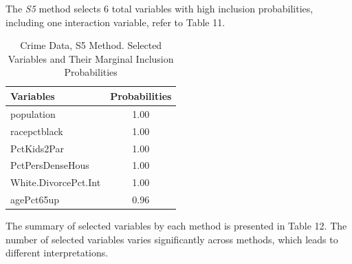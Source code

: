 \documentclass[
  11pt,
]{article}
\begin{document}
The \emph{S5} method selects 6 total variables with high inclusion
probabilities, including one interaction variable, refer to Table 11.

\begin{table}[H]

\caption{\label{tab:S5 Results}Crime Data, S5 Method. Selected Variables and Their Marginal Inclusion Probabilities}
\centering
\fontsize{10}{12}\selectfont
\begin{tabular}[t]{lc}
\toprule
\textbf{Variables} & \textbf{Probabilities}\\
\midrule
population & 1.00\\
racepctblack & 1.00\\
PctKids2Par & 1.00\\
PctPersDenseHous & 1.00\\
White.DivorcePct.Int & 1.00\\
\addlinespace
agePct65up & 0.96\\
\bottomrule
\end{tabular}
\end{table}

The summary of selected variables by each method is presented in Table
12. The number of selected variables varies significantly across
methods, which leads to different interpretations.
\end{document}
